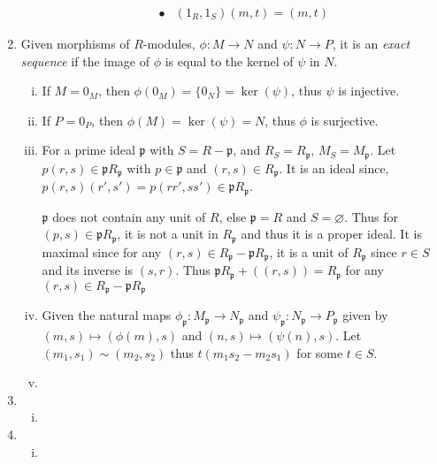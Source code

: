 \documentclass[a4paper,10pt]{article}
\theoremstyle{definition}
\begin{document}
\begin{enumerate}[1.]
\begin{enumerate}[(i)]
\begin{align*}
\bullet &(1_R,1_S)(m,t) = (m,t)
\end{align*}
\end{enumerate}
\item Given morphisms of $R$-modules, $\phi:M \to N$ and $\psi:N\to P$, it is an \emph{exact sequence} if the image of $\phi$ is equal to the kernel of $\psi$ in $N$.
\begin{enumerate}[(i)]
\item If $M=0_M$, then $\phi(0_M) = \{0_N\} = \ker(\psi)$, thus $\psi$ is injective.
\item If $P=0_P$, then $\phi(M) = \ker(\psi) = N$, thus $\phi$ is surjective.
\item For a prime ideal $\mathfrak{p}$ with $S = R - \mathfrak{p}$, and $R_S = R_\mathfrak{p}$, $M_S = M_\mathfrak{p}$. Let $p(r,s) \in \mathfrak{p}R_{\mathfrak{p}}$ with $p \in \mathfrak{p}$ and $(r,s) \in R_{\mathfrak{p}}$. It is an ideal since, $p(r,s)(r',s')=p(rr',ss') \in \mathfrak{p}R_{\mathfrak{p}}$. 


$\mathfrak{p}$ does not contain any unit of $R$, else $\mathfrak{p} = R$ and $S = \varnothing$. Thus for $(p,s) \in \mathfrak{p}R_{\mathfrak{p}}$, it is not a unit in $R_{\mathfrak{p}}$ and thus it is a proper ideal. It is maximal since for any $(r,s) \in R_{\mathfrak{p}}-\mathfrak{p}R_{\mathfrak{p}}$, it is a unit of $R_{\mathfrak{p}}$ since $r \in S$ and its inverse is $(s,r)$. Thus $\mathfrak{p}R_{\mathfrak{p}}+((r,s)) = R_{\mathfrak{p}}$ for any $(r,s) \in R_{\mathfrak{p}}-\mathfrak{p}R_{\mathfrak{p}}$

\item Given the natural maps $\phi_\mathfrak{p}:M_{\mathfrak{p}} \to N_{\mathfrak{p}}$ and $\psi_\mathfrak{p}:N_{\mathfrak{p}} \to P_{\mathfrak{p}}$ given by $(m,s) \mapsto (\phi(m),s)$ and $(n,s) \mapsto (\psi(n),s)$. Let $(m_1,s_1) \sim (m_2,s_2)$ thus $t(m_1s_2-m_2s_1)$ for some $t \in S$.
\item
\end{enumerate}
\item
\begin{enumerate}[(i)]
\item
\end{enumerate}
\item
\begin{enumerate}[(i)]
\item
\end{enumerate}


\end{enumerate}
\end{document}
